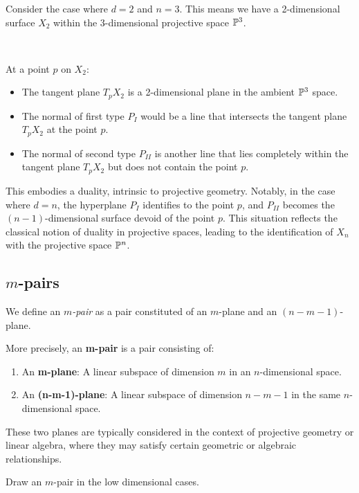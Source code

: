 \begin{example}
    Consider the case where $d = 2$ and  $n = 3 $. This means we have a 2-dimensional surface $ X_2$  within the 3-dimensional projective space $\mathbb{P}^{3}$.

\, 

At a point $p$ on $X_2 $:

\begin{itemize}
    \item The tangent plane  $T_{p}X_{2}$ is a 2-dimensional plane in the ambient $\mathbb{P}^{3}$ space.
    \item The normal of first type   $P_{I} $ would be a line that intersects the tangent plane   $T_{p}X_{2}$  at the point   $p$.
    \item The normal of second type  $P_{II}$ is another line that lies completely within the tangent plane  $ T_{p}X_{2}$ but does not contain the point  $p$.
    \end{itemize}
    \end{example}


This embodies a duality, intrinsic to projective geometry. Notably, in the  case where $d = n$, the hyperplane $P_{I}$ identifies to the point $p$, and $P_{II}$ becomes the $(n-1)$-dimensional surface devoid of the point $p$. This situation reflects the classical notion of duality in projective spaces, leading to the identification of $X_{n}$ with the projective space $\mathbb{P}^{n}$.

\subsection{$m$-pairs}
\begin{definition}\label{D:mpairs}
We define an \textit{$m$-pair} as a pair constituted of an $m$-plane and an $(n-m-1)$-plane.
\end{definition}

More precisely, an \textbf{m-pair} is a pair consisting of:
\begin{enumerate}
    \item An \textbf{m-plane}: A linear subspace of dimension $m $ in an $n $-dimensional space.
    \item An \textbf{(n-m-1)-plane}: A linear subspace of dimension $n-m-1$ in the same $n$-dimensional space.
\end{enumerate}

These two planes are typically considered in the context of projective geometry or linear algebra, where they may satisfy certain geometric or algebraic relationships.
\begin{ex}
Draw an $m$-pair in the low dimensional cases. 
\end{ex}



